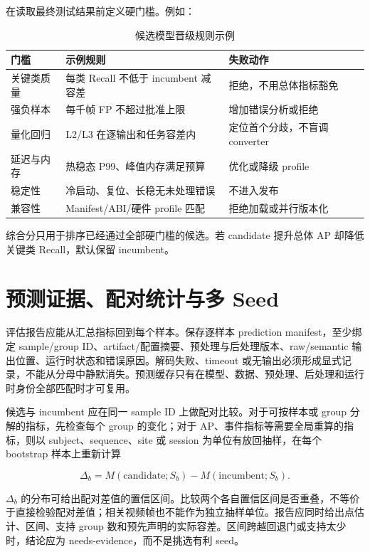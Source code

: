在读取最终测试结果前定义硬门槛。例如：

\begin{table}[H]
  \centering
  \caption{候选模型晋级规则示例}
  \begin{tabular}{p{29mm}p{45mm}p{56mm}}
    \hline
    门槛 & 示例规则 & 失败动作 \\
    \hline
    关键类质量 & 每类 Recall 不低于 incumbent 减容差 & 拒绝，不用总体指标豁免 \\
    强负样本 & 每千帧 FP 不超过批准上限 & 增加错误分析或拒绝 \\
    量化回归 & L2/L3 在逐输出和任务容差内 & 定位首个分歧，不盲调 converter \\
    延迟与内存 & 热稳态 P99、峰值内存满足预算 & 优化或降级 profile \\
    稳定性 & 冷启动、复位、长稳无未处理错误 & 不进入发布 \\
    兼容性 & Manifest/ABI/硬件 profile 匹配 & 拒绝加载或并行版本化 \\
    \hline
  \end{tabular}
\end{table}

综合分只用于排序已经通过全部硬门槛的候选。若 candidate 提升总体 AP 却降低关键类 Recall，默认保留 incumbent。

\section{预测证据、配对统计与多 Seed}

评估报告应能从汇总指标回到每个样本。保存逐样本 prediction manifest，至少绑定 sample/group ID、artifact/配置摘要、预处理与后处理版本、raw/semantic 输出位置、运行时状态和错误原因。解码失败、timeout 或无输出必须形成显式记录，不能从分母中静默消失。预测缓存只有在模型、数据、预处理、后处理和运行时身份全部匹配时才可复用。

候选与 incumbent 应在同一 sample ID 上做配对比较。对于可按样本或 group 分解的指标，先检查每个 group 的变化；对于 AP、事件指标等需要全局重算的指标，则以 subject、sequence、site 或 session 为单位有放回抽样，在每个 bootstrap 样本上重新计算

\begin{equation}
  \Delta_b=M(\text{candidate};S_b)-M(\text{incumbent};S_b).
\end{equation}

$\Delta_b$ 的分布可给出配对差值的置信区间\cite{bootstrap-methods}。比较两个各自置信区间是否重叠，不等价于直接检验配对差值；相关视频帧也不能作为独立抽样单位。报告应同时给出点估计、区间、支持 group 数和预先声明的实际容差。区间跨越回退门或支持太少时，结论应为 needs-evidence，而不是挑选有利 seed。


